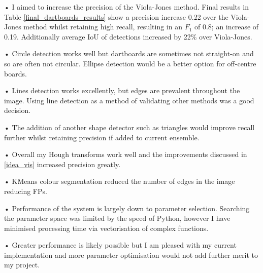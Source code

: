 \documentclass[11pt]{article}
\begin{document}
• I aimed to increase the precision of the Viola-Jones method. Final results in Table \ref{final_dartboards_results} show a precision increase 0.22 over the Viola-Jones method whilst retaining high recall, resulting in an $F_1$ of 0.8; an increase of 0.19. Additionally average IoU of detections increased by 22\% over Viola-Jones.

\noindent • Circle detection works well but dartboards are sometimes not straight-on and so are often not circular. Ellipse detection would be a better option for off-centre boards.

\noindent • Lines detection works excellently, but edges are prevalent throughout the image. Using line detection as a method of validating other methods was a good decision.

\noindent • The addition of another shape detector such as triangles would improve recall further whilst retaining precision if added to current ensemble. 

\noindent • Overall my Hough transforms work well and the improvements discussed in \ref{idea_vis} increased precision greatly.

\noindent • KMeans colour segmentation reduced the number of edges in the image reducing FPs.

\noindent • Performance of the system is largely down to parameter selection. Searching the parameter space was limited by the speed of Python, however I have minimised processing time via vectorisation of complex functions. 

\noindent • Greater performance is likely possible but I am pleased with my current implementation and more parameter optimisation would not add further merit to my project.
\end{document}
